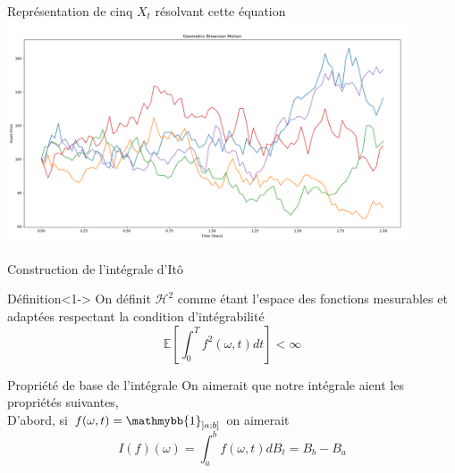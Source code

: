 \documentclass{beamer}
\newcommand{\1}{\mathmybb{1}}
\begin{document}
 \begin{frame}{Représentation de cinq $X_{t}$ résolvant cette équation}
   \includegraphics[width=12cm]{imgs/bs5.png}
 \end{frame}
 \begin{frame}{Construction de l'intégrale d'Itô}
   \begin{block}{Définition}<1->
     On définit $\mathcal{H}^{2}$ comme étant l'espace des fonctions mesurables et adaptées respectant la condition d'intégrabilité \\
     \[
       \mathbb{E}\left[\int_{0}^{T}f^{2}(\omega, t) dt \right] < \infty
     \]
   \end{block}
    \begin{block}{Propriété de base de l'intégrale}
     On aimerait que notre intégrale aient les propriétés suivantes, \\
D'abord, si $ f(\omega, t) = \1_{\left] a; b \right]} $ on aimerait
     \[
       I(f)(\omega) = \int_{a}^{b}f(\omega, t) dB_{t} = B_{b} - B_{a}
     \]
   \end{block}

 \end{frame}
 
\end{document}
